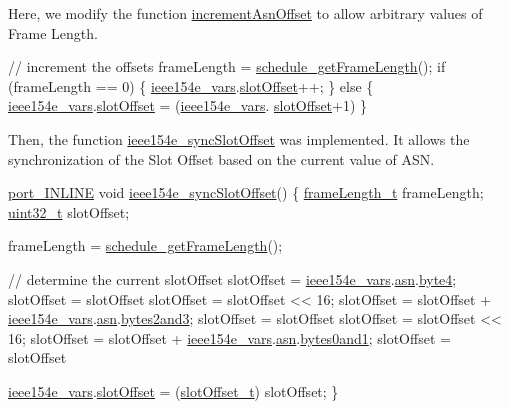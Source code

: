 Here, we modify the function \hyperlink{_i_e_e_e802154_e_8c_af7ddc5c9b10da0b029a6cdf13d40455d}{increment\+Asn\+Offset} to allow arbitrary values of Frame Length. 
\begin{DoxyCodeInclude}
   \textcolor{comment}{// increment the offsets}
   frameLength = \hyperlink{group___schedule_gad9d1ef9965017c2923cb6905b7cc6b7f}{schedule\_getFrameLength}();
   \textcolor{keywordflow}{if} (frameLength == 0) \{
      \hyperlink{_i_e_e_e802154_e_8c_abbfc7f36c7b2d2635f4407908445a89b}{ieee154e\_vars}.\hyperlink{structieee154e__vars__t_afaebb453ec589e83866278ddf8d1cb9d}{slotOffset}++;
   \} \textcolor{keywordflow}{else} \{
      \hyperlink{_i_e_e_e802154_e_8c_abbfc7f36c7b2d2635f4407908445a89b}{ieee154e\_vars}.\hyperlink{structieee154e__vars__t_afaebb453ec589e83866278ddf8d1cb9d}{slotOffset}  = (\hyperlink{_i_e_e_e802154_e_8c_abbfc7f36c7b2d2635f4407908445a89b}{ieee154e\_vars}.
      \hyperlink{structieee154e__vars__t_afaebb453ec589e83866278ddf8d1cb9d}{slotOffset}+1)%
   \}
\end{DoxyCodeInclude}
 Then, the function \hyperlink{_i_e_e_e802154_e_8c_aee836d385fb2379dd04956ad7b3cfe37}{ieee154e\+\_\+sync\+Slot\+Offset} was implemented. It allows the synchronization of the Slot Offset based on the current value of A\+SN. 
\begin{DoxyCodeInclude}
\hyperlink{samr21__xpro_2board__info_8h_ac176b886c94b2cf591ec32600fb61a07}{port\_INLINE} \textcolor{keywordtype}{void} \hyperlink{_i_e_e_e802154_e_8c_aee836d385fb2379dd04956ad7b3cfe37}{ieee154e\_syncSlotOffset}() \{
   \hyperlink{group___schedule_gab960413860c0b01b38ece025b0ee534d}{frameLength\_t} frameLength;
   \hyperlink{_p_e___types_8h_a33594304e786b158f3fb30289278f5af}{uint32\_t} slotOffset;

   frameLength = \hyperlink{group___schedule_gad9d1ef9965017c2923cb6905b7cc6b7f}{schedule\_getFrameLength}();

   \textcolor{comment}{// determine the current slotOffset}
   slotOffset = \hyperlink{_i_e_e_e802154_e_8c_abbfc7f36c7b2d2635f4407908445a89b}{ieee154e\_vars}.\hyperlink{structieee154e__vars__t_ad43118eadedc6a7dabf63f316bdda819}{asn}.\hyperlink{structasn__t_af158e9c9bc092ed0347896a9c024c258}{byte4};
   slotOffset = slotOffset %
   slotOffset = slotOffset << 16;
   slotOffset = slotOffset + \hyperlink{_i_e_e_e802154_e_8c_abbfc7f36c7b2d2635f4407908445a89b}{ieee154e\_vars}.\hyperlink{structieee154e__vars__t_ad43118eadedc6a7dabf63f316bdda819}{asn}.\hyperlink{structasn__t_ae7a99f086ee6e28c6c72e248b6041b95}{bytes2and3};
   slotOffset = slotOffset %
   slotOffset = slotOffset << 16;
   slotOffset = slotOffset + \hyperlink{_i_e_e_e802154_e_8c_abbfc7f36c7b2d2635f4407908445a89b}{ieee154e\_vars}.\hyperlink{structieee154e__vars__t_ad43118eadedc6a7dabf63f316bdda819}{asn}.\hyperlink{structasn__t_a9d2a032fe9b1adf08fc25d1cc73e8745}{bytes0and1};
   slotOffset = slotOffset %

   \hyperlink{_i_e_e_e802154_e_8c_abbfc7f36c7b2d2635f4407908445a89b}{ieee154e\_vars}.\hyperlink{structieee154e__vars__t_afaebb453ec589e83866278ddf8d1cb9d}{slotOffset}       = (\hyperlink{group___schedule_ga30a663860a70d8c9db2c3a8e66f544fc}{slotOffset\_t}) slotOffset;
\}
\end{DoxyCodeInclude}
